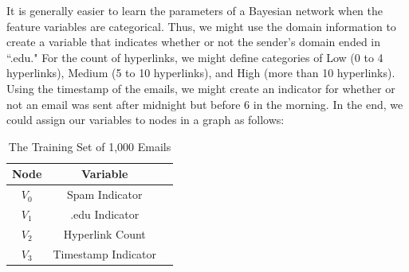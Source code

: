 \documentclass[12pt,twoside]{reedthesis}
\begin{document}
	It is generally easier to learn the parameters of a Bayesian network when the feature variables are categorical. Thus, we might use the domain information to create a variable that indicates whether or not the sender's domain ended in ``.edu." For the count of hyperlinks, we might define categories of Low (0 to 4 hyperlinks), Medium (5 to 10 hyperlinks), and High (more than 10 hyperlinks). Using the timestamp of the emails, we might create an indicator for whether or not an email was sent after midnight but before 6 in the morning. In the end, we could assign our variables to nodes in a graph as follows:

\begin{table}[htdp] %
\caption[Example Training Data for Na\"{i}ve Bayes Classification]{The Training Set of 1,000 Emails} 
\begin{center} 
\begin{tabular}{c | c c} 
\toprule %
  Node &  Variable  \\ %
  \midrule %
 $V_0$ & Spam Indicator \\ %
 $V_1$ & .edu Indicator \\
 $V_2$ & Hyperlink Count \\
 $V_3$ & Timestamp Indicator  \\
\bottomrule %
\end{tabular}
\end{center}
\label{inheritance} %
\end{table}
	
\end{document}

